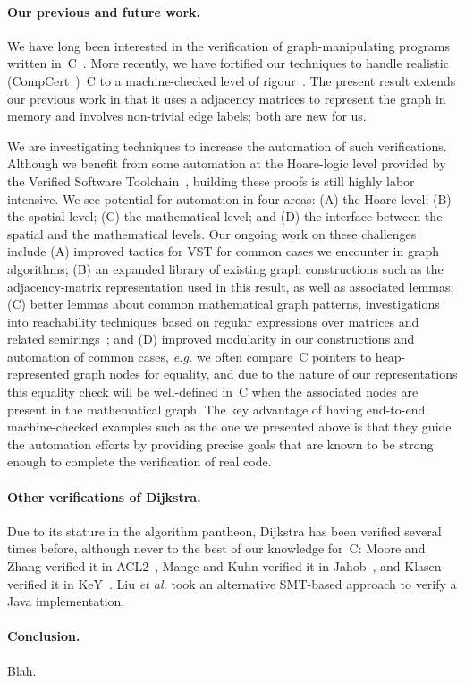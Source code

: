 \paragraph{Our previous and future work.} We have long been interested in
the verification of graph-manipulating programs written in~C~\cite{hobor:ramification}.
More recently, we have fortified our techniques to handle realistic (CompCert~\cite{leroy:compcert})~C
to a machine-checked level of rigour~\cite{DBLP:journals/pacmpl/WangCMH19}.  The present result extends
our previous work in that it uses a adjacency matrices to represent the graph in
memory and involves non-trivial edge labels; both are new for us.

We are investigating techniques to increase the automation of such verifications.  Although
we benefit from some automation at the Hoare-logic level provided by the Verified Software
Toolchain~\cite{appel:programlogics}, building these proofs is still highly labor intensive.  We see potential
for automation in four areas: (A) the Hoare level; (B) the spatial level; (C) the mathematical level; and (D) the interface between the spatial and the mathematical levels.  Our ongoing work
on these challenges include (A) improved tactics for VST for common cases we encounter in graph
algorithms; (B) an expanded library of existing graph constructions such as the adjacency-matrix representation used in this result, as well as associated lemmas;
(C) better lemmas about common mathematical graph patterns, investigations into reachability techniques
based on regular expressions over matrices and related semirings~\cite{backhouse,DBLP:journals/jacm/Tarjan81a,dolan2013fun,krishna2017go}; and (D) improved modularity in our constructions and
automation of common cases, \emph{e.g.} we often compare~C pointers to heap-represented graph
nodes for equality, and due to the nature of our representations this equality check will be
well-defined in~C when the associated nodes are present in the mathematical graph.  The key
advantage of having end-to-end machine-checked examples such as the one we presented above is 
that they guide the automation efforts by providing precise goals that are known to be strong 
enough to complete the verification of real code.

\paragraph{Other verifications of Dijkstra.}
Due to its stature in the algorithm pantheon, Dijkstra has been verified several times before, although never to the best of our knowledge for~C: Moore and Zhang verified it in ACL2~\cite{Moore2005}, Mange and Kuhn verified it in Jahob~\cite{mange2007verifying}, and Klasen verified it in KeY~\cite{klasen2010verifying}.  Liu \emph{et al.} took an alternative SMT-based approach to verify a Java implementation.

\paragraph{Conclusion.}
Blah.
